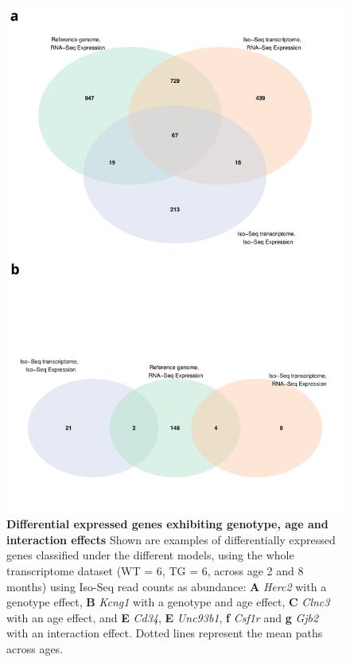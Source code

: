 \begin{figure}[h]
	\centering
	\includegraphics[page=6,scale = 0.55]{Figures/WholeDifferentialAnalysis.pdf}
	\captionsetup{width=0.95\textwidth}
	\caption[Examples of gene expression differing across conditions]%
	{\textbf{Differential expressed genes exhibiting genotype, age and interaction effects} Shown are examples of differentially expressed genes classified under the different models, using the whole transcriptome dataset (WT = 6, TG = 6, across age 2 and 8 months) using Iso-Seq read counts as abundance: \textbf{A} \textit{Herc2} with a genotype effect, \textbf{B} \textit{Kcng1} with a genotype and age effect, \textbf{C} \textit{Clnc3} with an age effect, and \textbf{E} \textit{Cd34}, \textbf{E} \textit{Unc93b1}, \textbf{f} \textit{Csf1r} and \textbf{g} \textit{Gjb2} with an interaction effect. Dotted lines represent the mean paths across ages.}   
	\label{fig:dea_model_genexp}
\end{figure}

